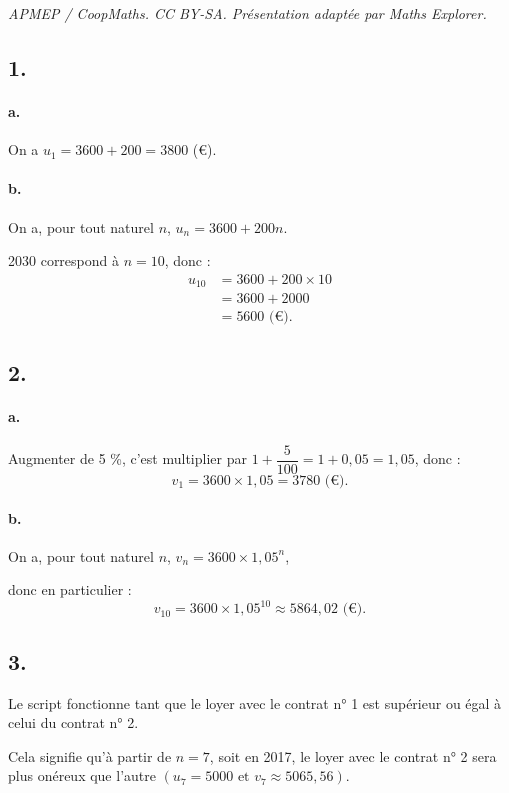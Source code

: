 \documentclass[10pt]{article}
\begin{document}
\noindent\textit{APMEP / CoopMaths. CC BY-SA. Présentation adaptée par Maths Explorer.}\par\medskip
\subsection*{1.}

\paragraph{a.} On a \( u_1 = 3600 + 200 = 3800 \) (€).

\paragraph{b.} On a, pour tout naturel \( n \), \( u_n = 3600 + 200n \).

2030 correspond à \( n = 10 \), donc :
\begin{align*}
u_{10} &= 3600 + 200 \times 10 \\
&= 3600 + 2000 \\
&= 5600 \text{ (€)}.
\end{align*}

\subsection*{2.}

\paragraph{a.} Augmenter de 5 \%, c'est multiplier par \( 1 + \dfrac{5}{100} = 1 + 0,05 = 1{,}05 \), donc :
\[
v_1 = 3600 \times 1{,}05 = 3780 \text{ (€)}.
\]

\paragraph{b.} On a, pour tout naturel \( n \), \( v_n = 3600 \times 1{,}05^n \),

donc en particulier :
\[
v_{10} = 3600 \times 1{,}05^{10} \approx 5864{,}02 \text{ (€)}.
\]

\subsection*{3.}

Le script fonctionne tant que le loyer avec le contrat n° 1 est supérieur ou égal à celui du contrat n° 2.

Cela signifie qu'à partir de \( n = 7 \), soit en 2017, le loyer avec le contrat n° 2 sera plus onéreux que l'autre \( (u_7 = 5000 \text{ et } v_7 \approx 5065{,}56) \).
\end{document}

